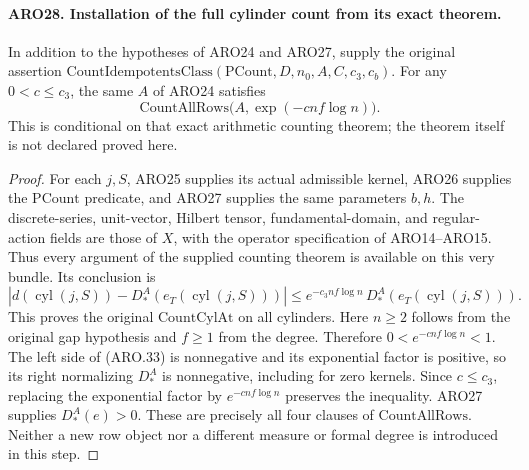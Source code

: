 \documentclass[11pt,a4paper]{article}
\numberwithin{equation}{section}
\theoremstyle{remark}\newtheorem{remark}[theorem]{Remark}
\begin{document}
\paragraph{ARO28. Installation of the full cylinder count from its exact theorem.}
\label{claim:ARO28}
In addition to the hypotheses of ARO24 and ARO27, supply the
original assertion
\(\mathrm{CountIdempotentsClass}(\mathrm{PCount},D,n_0,A,C,c_3,c_b)\).
For any \(0<c\leq c_3\), the same \(A\) of ARO24 satisfies
\[
        \mathrm{CountAllRows}\bigl(A,\exp(-cnf\log n)\bigr).
 \tag{ARO.32}
\]
This is conditional on that exact arithmetic counting theorem;
the theorem itself is not declared proved here.
\begin{proof}
For each \(j,S\), ARO25 supplies its actual admissible kernel,
ARO26 supplies the \(\mathrm{PCount}\) predicate, and ARO27
supplies the same parameters \(b,h\).  The discrete-series,
unit-vector, Hilbert tensor, fundamental-domain, and regular-action
fields are those of \(X\), with the operator specification of
ARO14--ARO15.  Thus every argument of the supplied counting
theorem is available on this very bundle.  Its conclusion is
\[
 \left|d(\operatorname{cyl}(j,S))-
                D_*^A(e_T(\operatorname{cyl}(j,S)))\right|
 \leq e^{-c_3nf\log n}\,
                D_*^A(e_T(\operatorname{cyl}(j,S))).   \tag{ARO.33}
\]
This proves the original \(\mathrm{CountCylAt}\) on all cylinders.
Here \(n\geq2\) follows from the original gap hypothesis and
\(f\geq1\) from the degree.  Therefore
\(0<e^{-cnf\log n}<1\).  The left side of (ARO.33) is
nonnegative and its exponential factor is positive, so its right
normalizing \(D_*^A\) is nonnegative, including for zero kernels.
Since \(c\leq c_3\), replacing the exponential factor by
\(e^{-cnf\log n}\) preserves the inequality.  ARO27 supplies
\(D_*^A(e)>0\).  These are precisely all four clauses of
\(\mathrm{CountAllRows}\).  Neither a new row object nor a
different measure or formal degree is introduced in this step.
\end{proof}

\end{document}
